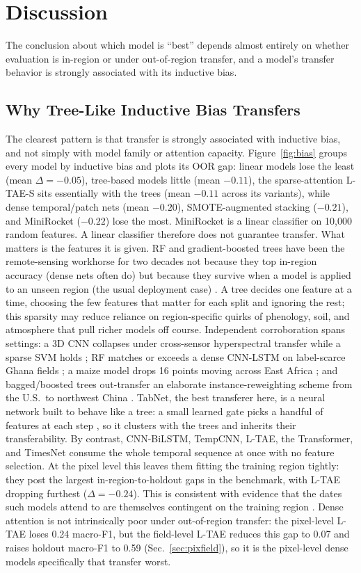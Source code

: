 \documentclass[preprint,authoryear]{elsarticle}
\begin{document}
\section{Discussion}
\label{sec:discussion}
The conclusion about which model is ``best'' depends almost entirely on whether evaluation is in-region or under out-of-region transfer, and a model's transfer behavior is strongly associated with its inductive bias.

\subsection{Why Tree-Like Inductive Bias Transfers}
The clearest pattern is that transfer is strongly associated with inductive bias, and not simply with model family or attention capacity. Figure~\ref{fig:bias} groups every model by inductive bias and plots its OOR gap: linear models lose the least (mean $\Delta=-0.05$), tree-based models little (mean $-0.11$), the sparse-attention L-TAE-S sits essentially with the trees (mean $-0.11$ across its variants), while dense temporal/patch nets (mean $-0.20$), SMOTE-augmented stacking ($-0.21$), and MiniRocket ($-0.22$) lose the most. MiniRocket is a linear classifier on 10{,}000 random features. A linear classifier therefore does not guarantee transfer. What matters is the features it is given. RF and gradient-boosted trees have been the remote-sensing workhorse for two decades not because they top in-region accuracy (dense nets often do) but because they survive when a model is applied to an unseen region (the usual deployment case) \citep{belgiu2016, maxwell2019}. A tree decides one feature at a time, choosing the few features that matter for each split and ignoring the rest; this sparsity may reduce reliance on region-specific quirks of phenology, soil, and atmosphere that pull richer models off course. Independent corroboration spans settings: a 3D CNN collapses under cross-sensor hyperspectral transfer while a sparse SVM holds \citep{pankajakshan2025}; RF matches or exceeds a dense CNN-LSTM on label-scarce Ghana fields \citep{rustowicz2019}; a maize model drops 16 points moving across East Africa \citep{jin2019}; and bagged/boosted trees out-transfer an elaborate instance-reweighting scheme from the U.S.\ to northwest China \citep{mai2025}. TabNet, the best transferer here, is a neural network built to behave like a tree: a small learned gate picks a handful of features at each step \citep{tabnet_orig}, so it clusters with the trees and inherits their transferability. By contrast, CNN-BiLSTM, TempCNN, L-TAE, the Transformer, and TimesNet consume the whole temporal sequence at once with no feature selection. At the pixel level this leaves them fitting the training region tightly: they post the largest in-region-to-holdout gaps in the benchmark, with L-TAE dropping furthest ($\Delta=-0.24$). This is consistent with evidence that the dates such models attend to are themselves contingent on the training region \citep{obadic2022}. Dense attention is not intrinsically poor under out-of-region transfer: the pixel-level L-TAE loses 0.24 macro-F1, but the field-level L-TAE reduces this gap to 0.07 and raises holdout macro-F1 to 0.59 (Sec.~\ref{sec:pixfield}), so it is the pixel-level dense models specifically that transfer worst.
\end{document}
